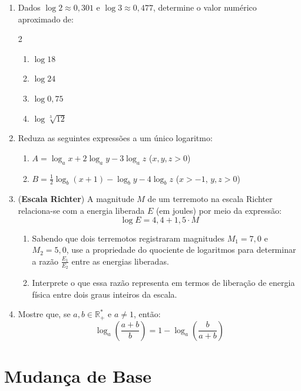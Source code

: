 \documentclass[12pt,a4paper]{report}
\begin{document}
	\begin{enumerate}
		\item Dados $\log 2 \approx 0{,}301$ e $\log 3 \approx 0{,}477$, determine o valor numérico aproximado de:
		\begin{multicols}{2}
			\begin{enumerate}[label=\textbf{\alph*)}]
				\item $\log 18$
				\item $\log 24$
				\item $\log 0{,}75$
				\item $\log \sqrt[3]{12}$
			\end{enumerate}
		\end{multicols}
		
		\item Reduza as seguintes expressões a um único logaritmo:
		\begin{enumerate}[label=\textbf{\alph*)}]
			\item $A = \log_a x + 2\log_a y - 3\log_a z$ \quad ($x, y, z > 0$)
			\item $B = \frac{1}{2}\log_b (x + 1) - \log_b y - 4\log_b z$ \quad ($x > -1$, $y, z > 0$)
		\end{enumerate}
		
		\item (\textbf{Escala Richter}) A magnitude $M$ de um terremoto na escala Richter relaciona-se com a energia liberada $E$ (em joules) por meio da expressão:
		$$\log E = 4{,}4 + 1{,}5 \cdot M$$
		\begin{enumerate}[label=\textbf{\alph*)}]
			\item Sabendo que dois terremotos registraram magnitudes $M_1 = 7{,}0$ e $M_2 = 5{,}0$, use a propriedade do quociente de logaritmos para determinar a razão $\frac{E_1}{E_2}$ entre as energias liberadas.
			\item Interprete o que essa razão representa em termos de liberação de energia física entre dois graus inteiros da escala.
		\end{enumerate}
		
		\item Mostre que, se $a, b \in \mathbb{R}^*_+$ e $a \neq 1$, então:
		$$\log_a \left(\frac{a + b}{b}\right) = 1 - \log_a \left(\frac{b}{a+b}\right)$$
	\end{enumerate}
	
	\section{Mudança de Base}
	
\end{document}

